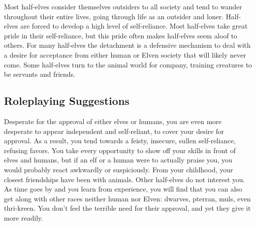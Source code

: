 Most half-elves consider themselves outsiders to all society and tend to wander throughout their entire lives, going through life as an outsider and loner. Half-elves are forced to develop a high level of self-reliance. Most half-elves take great pride in their self-reliance, but this pride often makes half-elves seem aloof to others. For many half-elves the detachment is a defensive mechanism to deal with a desire for acceptance from either human or Elven society that will likely never come. Some half-elves turn to the animal world for company, training creatures to be servants and friends.

\subsection{Roleplaying Suggestions}
Desperate for the approval of either elves or humans, you are even more desperate to appear independent and self-reliant, to cover your desire for approval. As a result, you tend towards a feisty, insecure, sullen self-reliance, refusing favors. You take every opportunity to show off your skills in front of elves and humans, but if an elf or a human were to actually praise you, you would probably react awkwardly or suspiciously. From your childhood, your closest friendships have been with animals. Other half-elves do not interest you. As time goes by and you learn from experience, you will find that you can also get along with other races neither human nor Elven: dwarves, pterran, muls, even thri-kreen. You don't feel the terrible need for their approval, and yet they give it more readily.


